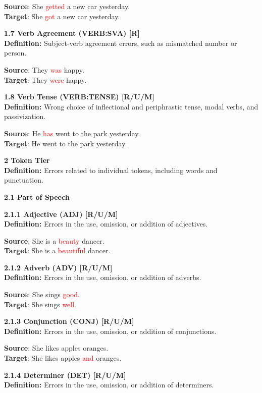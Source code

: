 \begin{tcolorbox}[breakable]
\textbf{Source}: She \textcolor{red}{getted} a new car yesterday. \\
\textbf{Target}: She \textcolor{red}{got} a new car yesterday.


\noindent \textbf{1.7 Verb Agreement (VERB:SVA) [R]}\\
\textbf{Definition:} Subject-verb agreement errors, such as mismatched number or person.


\textbf{Source}: They \textcolor{red}{was} happy. \\
\textbf{Target}: They \textcolor{red}{were} happy.


\noindent \textbf{1.8 Verb Tense (VERB:TENSE) [R/U/M]}\\
\textbf{Definition:} Wrong choice of inflectional and periphrastic tense, modal verbs, and passivization.


\textbf{Source}: He \textcolor{red}{has} went to the park yesterday. \\
\textbf{Target}: He went to the park yesterday.


\noindent \textbf{2 Token Tier}\\
\textbf{Definition:} Errors related to individual tokens, including words and punctuation.

\noindent \textbf{2.1 Part of Speech}

\noindent \textbf{2.1.1 Adjective (ADJ) [R/U/M]}\\
\textbf{Definition:} Errors in the use, omission, or addition of adjectives.


\textbf{Source}: She is a \textcolor{red}{beauty} dancer. \\
\textbf{Target}: She is a \textcolor{red}{beautiful} dancer.


\noindent \textbf{2.1.2 Adverb (ADV) [R/U/M]}\\
\textbf{Definition:} Errors in the use, omission, or addition of adverbs.


\textbf{Source}: She sings \textcolor{red}{good}. \\
\textbf{Target}: She sings \textcolor{red}{well}.


\noindent \textbf{2.1.3 Conjunction (CONJ) [R/U/M]}\\
\textbf{Definition:} Errors in the use, omission, or addition of conjunctions.


\textbf{Source}: She likes apples oranges. \\
\textbf{Target}: She likes apples \textcolor{red}{and} oranges.


\noindent \textbf{2.1.4 Determiner (DET) [R/U/M]}\\
\textbf{Definition:} Errors in the use, omission, or addition of determiners.



\end{tcolorbox}
